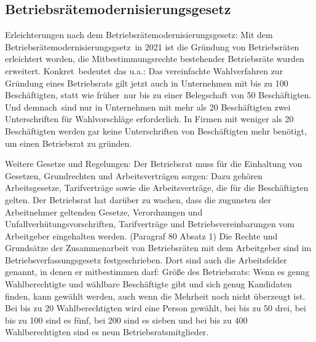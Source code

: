 \subsection*{Betriebsrätemodernisierungsgesetz}
{
Erleichterungen nach dem Betriebsrätemodernisierungsgesetz: 
Mit dem Betriebsrätemodernisierungsgsetz in 2021 ist die Gründung von Betriebsräten erleichtert worden, die Mitbestimmungsrechte bestehender Betriebsräte wurden erweitert. Konkret bedeutet das u.a.: Das vereinfachte Wahlverfahren zur Gründung eines Betriebsrats gilt jetzt auch in Unternehmen mit bis zu 100 Beschäftigten, statt wie früher nur bis zu einer Belegschaft von 50 Beschäftigten. Und demnach sind nur in Unternehmen mit mehr als 20 Beschäftigten zwei Unterschriften für Wahlvorschläge erforderlich. In Firmen mit weniger als 20 Beschäftigten werden gar keine Unterschriften von Beschäftigten mehr benötigt, um einen Betriebsrat zu gründen.
\newline

}
\newline
Weitere Gesetze und Regelungen: Der Betriebsrat muss für die Einhaltung von Gesetzen, Grundrechten und Arbeitsverträgen sorgen: Dazu gehören Arbeitsgesetze, Tarifverträge sowie die Arbeitsverträge, die für die Beschäftigten gelten. Der Betriebsrat hat darüber zu wachen, dass die zugunsten der Arbeitnehmer geltenden Gesetze, Verordnungen und Unfallverhütungsvorschriften, Tarifverträge und Betriebsvereinbarungen vom Arbeitgeber eingehalten werden. (Paragraf 80 Absatz 1)
\newline 
Die Rechte und Grundsätze der Zusammenarbeit von Betriebsräten mit dem Arbeitgeber sind im Betriebsverfassungsgesetz festgeschrieben. Dort sind auch die Arbeitsfelder genannt, in denen er mitbestimmen darf:
\newline 
Größe des Betriebsrats: Wenn es genug Wahlberechtigte und wählbare Beschäftigte gibt und sich genug Kandidaten finden, kann gewählt werden, auch wenn die Mehrheit noch nicht überzeugt ist. Bei bis zu 20 Wahlberechtigten wird eine Person gewählt, bei bis zu 50 drei, bei bis zu 100 sind es fünf, bei 200 sind es sieben und bei bis zu 400 Wahlberechtigten sind es neun Betriebsratsmitglieder.

